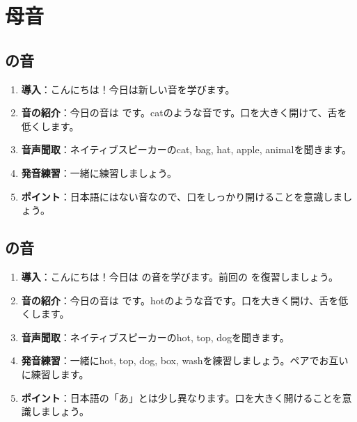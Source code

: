 \documentclass[book,jafontscale=0.9247]{jlreq}
\begin{document}
\tableofcontents
\clearpage
\chapter{母音}
\section{\textipa{\textipa{/\ae /}} の音}
\begin{enumerate}
    \item \textbf{導入}：こんにちは！今日は新しい音を学びます。
    \item \textbf{音の紹介}：今日の音は \textipa{/\ae /} です。catのような音です。口を大きく開けて、舌を低くします。
    \item \textbf{音声聞取}：ネイティブスピーカーのcat, bag, hat, apple, animalを聞きます。
    \item \textbf{発音練習}：一緒に練習しましょう。
    \item \textbf{ポイント}：日本語にはない音なので、口をしっかり開けることを意識しましょう。
 \end{enumerate}

\section{\textipa{/\textscripta /} の音}
\begin{enumerate}
    \item \textbf{導入}：こんにちは！今日は \textipa{/\textscripta /} の音を学びます。前回の  を復習しましょう。
    \item \textbf{音の紹介}：今日の音は \textipa{/\textscripta /} です。hotのような音です。口を大きく開け、舌を低くします。
    \item \textbf{音声聞取}：ネイティブスピーカーのhot, top, dogを聞きます。
    \item \textbf{発音練習}：一緒にhot, top, dog, box, washを練習しましょう。ペアでお互いに練習します。
    \item \textbf{ポイント}：日本語の「あ」とは少し異なります。口を大きく開けることを意識しましょう。
\end{enumerate}

\end{document}
